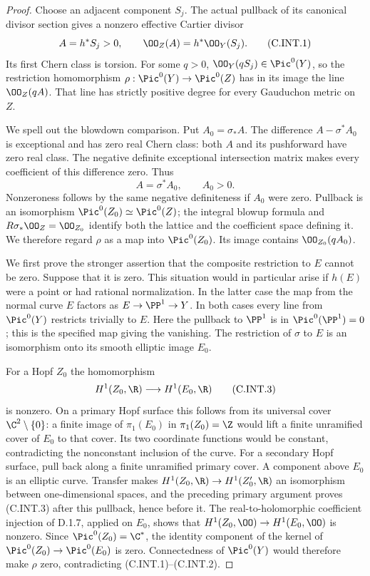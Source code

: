 \begin{proof}
Choose an adjacent component $S_j$. The actual pullback
of its canonical divisor section gives a nonzero effective
Cartier divisor
\[
 A=h^*S_j>0,\qquad \OO_Z(A)=h^*\OO_Y(S_j).
 \tag{C.INT.1}
\]
Its first Chern class is torsion. For some $q>0$,
$\OO_Y(qS_j)\in\Pic^0(Y)$, so the restriction homomorphism
$\rho:\Pic^0(Y)\to\Pic^0(Z)$ has in its image the line
$\OO_Z(qA)$. That line has strictly positive degree for
every Gauduchon metric on $Z$.

We spell out the blowdown comparison. Put $A_0=\sigma_*A$.
The difference $A-\sigma^*A_0$ is exceptional and has
zero real Chern class: both $A$ and its pushforward have
zero real class. The negative definite exceptional
intersection matrix makes every coefficient of this
difference zero. Thus
\[
 A=\sigma^*A_0,\qquad A_0>0.
 \tag{C.INT.2}
\]
Nonzeroness follows by the same negative definiteness if
$A_0$ were zero. Pullback is an isomorphism
$\Pic^0(Z_0)\simeq\Pic^0(Z)$; the integral blowup
formula and $R\sigma_*\OO_Z=\OO_{Z_0}$ identify both
the lattice and the coefficient space defining it.
We therefore regard $\rho$ as a map into $\Pic^0(Z_0)$.
Its image contains $\OO_{Z_0}(qA_0)$.

We first prove the stronger assertion that the composite
restriction to $E$ cannot be zero. Suppose that it is zero.
This situation would in particular arise if $h(E)$ were
a point or had rational normalization.
In the latter case the map from the normal curve $E$
factors as $E\to\PP^1\to Y$. In both cases every line
from $\Pic^0(Y)$ restricts trivially to $E$. Here the
pullback to $\PP^1$ is in $\Pic^0(\PP^1)=0$; this is
the specified map giving the vanishing. The restriction
of $\sigma$ to $E$ is an isomorphism onto its smooth
elliptic image $E_0$.

For a Hopf $Z_0$ the homomorphism
\[
 H^1(Z_0,\R)\longrightarrow H^1(E_0,\R)
 \tag{C.INT.3}
\]
is nonzero. On a primary Hopf surface this follows from
its universal cover $\C^2\setminus\{0\}$: a finite image
of $\pi_1(E_0)$ in $\pi_1(Z_0)=\Z$ would lift a finite
unramified cover of $E_0$ to that cover. Its two coordinate
functions would be constant, contradicting the nonconstant
inclusion of the curve. For a secondary Hopf surface,
pull back along a finite unramified primary cover. A
component above $E_0$ is an elliptic curve. Transfer makes
$H^1(Z_0,\R)\to H^1(Z'_0,\R)$ an isomorphism between
one-dimensional spaces, and the preceding primary
argument proves (C.INT.3) after this pullback, hence
before it. The real-to-holomorphic coefficient injection
of D.1.7, applied on $E_0$, shows that
$H^1(Z_0,\OO)\to H^1(E_0,\OO)$ is nonzero. Since
$\Pic^0(Z_0)=\C^*$, the identity component of the
kernel of $\Pic^0(Z_0)\to\Pic^0(E_0)$ is zero.
Connectedness of $\Pic^0(Y)$ would therefore make
$\rho$ zero, contradicting (C.INT.1)--(C.INT.2).


\end{proof}
